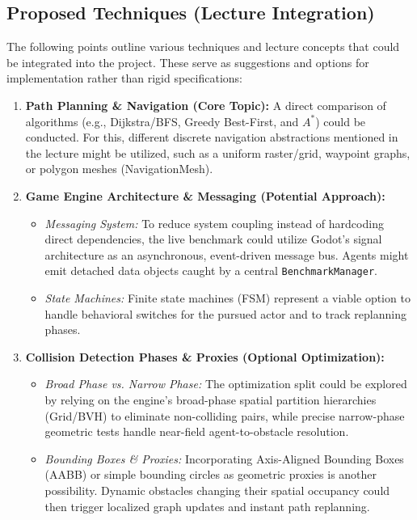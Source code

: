 \documentclass[11pt,a4paper]{article}
\begin{document}
\newpage 

\subsection{Proposed Techniques (Lecture Integration)}

The following points outline various techniques and lecture concepts that could be integrated into the project. These serve as suggestions and options for implementation rather than rigid specifications:

\begin{enumerate}[leftmargin=1.4em]
  \item \textbf{Path Planning \& Navigation (Core Topic):} 
  A direct comparison of algorithms (e.g., Dijkstra/BFS, Greedy Best-First, and $A^*$) could be conducted. For this, different discrete navigation abstractions mentioned in the lecture might be utilized, such as a uniform raster/grid, waypoint graphs, or polygon meshes (NavigationMesh).
  
  \item \textbf{Game Engine Architecture \& Messaging (Potential Approach):} 
  \begin{itemize}
    \item \textit{Messaging System:} To reduce system coupling instead of hardcoding direct dependencies, the live benchmark could utilize Godot's signal architecture as an asynchronous, event-driven message bus. Agents might emit detached data objects caught by a central \texttt{BenchmarkManager}.
    \item \textit{State Machines:} Finite state machines (FSM) represent a viable option to handle behavioral switches for the pursued actor and to track replanning phases.
  \end{itemize}
  
  \item \textbf{Collision Detection Phases \& Proxies (Optional Optimization):} 
  \begin{itemize}
    \item \textit{Broad Phase vs. Narrow Phase:} The optimization split could be explored by relying on the engine's broad-phase spatial partition hierarchies (Grid/BVH) to eliminate non-colliding pairs, while precise narrow-phase geometric tests handle near-field agent-to-obstacle resolution.
    \item \textit{Bounding Boxes \& Proxies:} Incorporating Axis-Aligned Bounding Boxes (AABB) or simple bounding circles as geometric proxies is another possibility. Dynamic obstacles changing their spatial occupancy could then trigger localized graph updates and instant path replanning.
  \end{itemize}
  

\end{enumerate}
\end{document}
